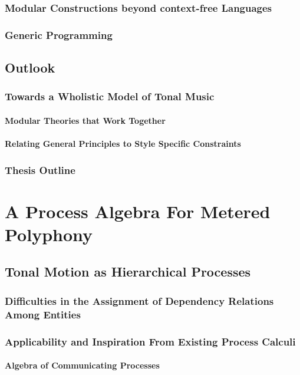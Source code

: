     \section{Modular Constructions beyond context-free Languages}
    \section{Generic Programming}
    
\chapter{Outlook}
    \section{Towards a Wholistic Model of Tonal Music}
        \subsection{Modular Theories that Work Together}
        \subsection{Relating General Principles to Style Specific Constraints}
    \section{Thesis Outline}
%
\cleardoublepage
\part{A Process Algebra For Metered Polyphony}
\chapter{Tonal Motion as Hierarchical Processes}
    \section{Difficulties in the Assignment of Dependency Relations Among Entities}
    \section{Applicability and Inspiration From Existing Process Calculi}
        \subsection{Algebra of Communicating Processes}
